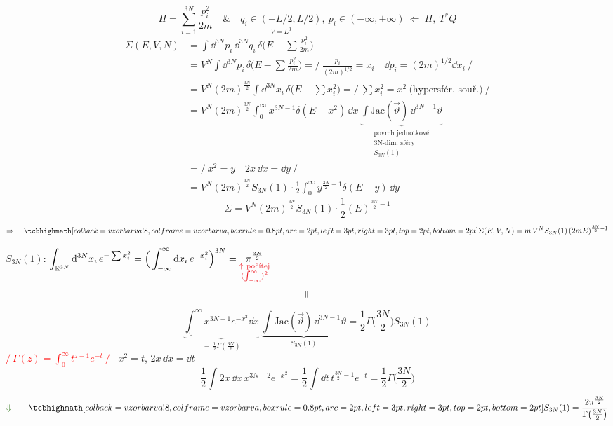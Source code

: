 {\color{NavyBlue}
\[
  H = \sum_{i=1}^{3N}\frac{p_i^2}{2m} \quad\&\quad
  \underset{V = L^3}{q_i\in(-L/2,L/2)},\ p_i\in(-\infty,+\infty) \ \Leftarrow\ H,\ T^*Q
\]
\begin{align*}
  \Sigma(E,V,N) &= \int\dd^{3N}p_i\,\dd^{3N}q_i\,\delta\Big(E - \sum\frac{p_i^2}{2m}\Big) \\
  &= V^N\int\dd^{3N}p_i\,\delta\Big(E - \sum\frac{p_i^2}{2m}\Big)
     = \Big/\ \frac{p_i}{(2m)^{1/2}} = x_i \quad \dd p_i = (2m)^{1/2}\dd x_i\ \Big/ \\
  &= V^N(2m)^{\frac{3N}{2}}\int\dd^{3N}x_i\,\delta\Big(E - \sum x_i^2\Big)
     = \Big/\ \sum x_i^2 = x^2 \ \text{(hypersfér.\ souř.)}\ \Big/ \\
  &= V^N(2m)^{\frac{3N}{2}}\int_0^\infty x^{3N-1}\delta(E - x^2)\,\dd x\
     \underbrace{\int\mathrm{Jac}(\vec\vartheta)\,\dd^{3N-1}\vartheta}_{\substack{\text{povrch jednotkové}\\ \text{3N-dim.\ sféry}\\ S_{3N}(1)}} \\
  &= \big/\ x^2 = y \quad 2x\,\dd x = \dd y\ \big/ \\
  &= V^N(2m)^{\frac{3N}{2}}S_{3N}(1)\cdot\frac12\int_0^\infty y^{\frac{3N}{2}-1}\delta(E - y)\,\dd y
\end{align*}
\[
  \Sigma = V^N(2m)^{\frac{3N}{2}}S_{3N}(1)\cdot\frac12(E)^{\frac{3N}{2}-1}
\]
\[
  \Rightarrow\quad \vzorec{\Sigma(E,V,N) = m\,V^NS_{3N}(1)\,(2mE)^{\frac{3N}{2}-1}}
\]
}

\textcolor{OliveGreen}{$S_{3N}(1)$:} \quad
{\color{BurntOrange}
$\displaystyle\int_{\mathbb R^{3N}}\dd^{3N}x_i\,e^{-\sum x_i^2} = \Big(\int_{-\infty}^{\infty}\dd x_i\,e^{-x_i^2}\Big)^{3N} =
\underset{\substack{\textcolor{Red}{\uparrow\ \text{počítej}}\\ \textcolor{Red}{(\int_{-\infty}^{\infty})^2}}}{\pi^{\frac{3N}{2}}}$
\[
  \rotatebox{90}{$=$}
\]
\[
  \underbrace{\int_0^\infty x^{3N-1}e^{-x^2}\dd x}_{=\,\frac12\Gamma(\frac{3N}{2})}\
  \underbrace{\int\mathrm{Jac}(\vec\vartheta)\,\dd^{3N-1}\vartheta}_{S_{3N}(1)}
  = \frac12\Gamma\Big(\frac{3N}{2}\Big)S_{3N}(1)
\]
\textcolor{Red}{$\Big/\ \Gamma(z) = \displaystyle\int_0^\infty t^{z-1}e^{-t}\ \Big/$} \ $x^2 = t$, $2x\,\dd x = \dd t$
\[
  \frac12\int 2x\,\dd x\,x^{3N-2}e^{-x^2} = \frac12\int\dd t\,t^{\frac{3N}{2}-1}e^{-t} = \frac12\Gamma\Big(\frac{3N}{2}\Big)
\]
}
\[
  \textcolor{OliveGreen}{\Downarrow}\qquad
  \vzorec{S_{3N}(1) = \frac{2\pi^{\frac{3N}{2}}}{\Gamma\big(\frac{3N}{2}\big)}}
\]

